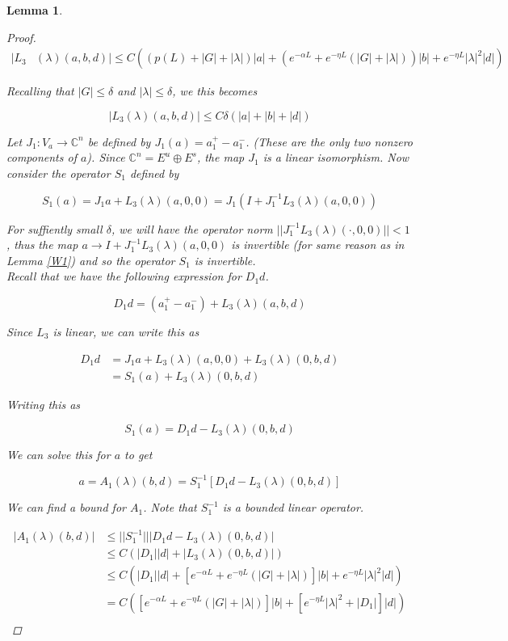 \documentclass[12pt]{article}
\def\C{{\mathbb C}}
\newtheorem{lemma}{Lemma}
\begin{document}
\begin{lemma}
\begin{proof}
\begin{align*}
|L_3&(\lambda)(a,b,d)| \leq C \left( \left( p(L) + |G| + |\lambda|\right) |a| + \left( e^{-\alpha L} + e^{-\eta L} \left(|G| + |\lambda|\right) \right) |b| + e^{-\eta L} |\lambda|^2 |d| \right)
\end{align*}


Recalling that $|G|\leq \delta$ and $|\lambda| \leq \delta$, we this becomes 

\[
|L_3(\lambda)(a,b,d)| \leq C\delta(|a| + |b| + |d|)
\]

Let $J_1: V_a \rightarrow \C^n$ be defined by $J_1(a) = a_1^+ - a_1^-$. (These are the only two nonzero components of $a$). Since $\C^n = E^u \oplus E^s$, the map $J_1$ is a linear isomorphism. Now consider the operator $S_1$ defined by

\[
S_1(a) = J_1 a + L_3(\lambda)(a, 0, 0) = J_1( I + J_1^{-1} L_3(\lambda)(a, 0, 0) )
\]

For suffiently small $\delta$, we will have the operator norm $||J_1^{-1} L_3(\lambda)(\cdot, 0, 0)|| < 1$, thus the map $a \rightarrow I + J_1^{-1} L_3(\lambda)(a, 0, 0)$ is invertible (for same reason as in Lemma \ref{W1}) and so the operator $S_1$ is invertible.\\

Recall that we have the following expression for $D_1 d$.

\[
D_1 d = (a^+_1 - a^-_1) + L_3(\lambda)(a,b,d)
\] 

Since $L_3$ is linear, we can write this as

\begin{align*}
D_1 d &= J_1 a + L_3(\lambda)(a, 0, 0) + L_3(\lambda)(0, b, d) \\
&= S_1(a) + L_3(\lambda)(0, b, d) 
\end{align*}

Writing this as 

\[
S_1(a) = D_1 d - L_3(\lambda)(0, b, d) 
\]

We can solve this for $a$ to get

\begin{equation}
a = A_1(\lambda)(b,d) = S_1^{-1}[D_1 d - L_3(\lambda)(0, b, d)] 
\end{equation}

We can find a bound for $A_1$. Note that $S_1^{-1}$ is a bounded linear operator.

\begin{align*}
|A_1(\lambda)(b,d)| &\leq ||S_1^{-1}|||D_1 d - L_3(\lambda)(0, b, d)| \\
&\leq C (|D_1||d| + |L_3(\lambda)(0, b, d)|) \\
&\leq C (|D_1||d| +  \left[e^{-\alpha L} + e^{-\eta L} \left(|G| + |\lambda| \right) \right]|b| + e^{-\eta L} |\lambda|^2 |d|)\\
&= C\left( \left[e^{-\alpha L} + e^{-\eta L} \left(|G| + |\lambda|\right) \right]|b| + \left[ e^{-\eta L} |\lambda|^2 + |D_1| \right] |d| \right)\\
\end{align*}


\end{proof}
\end{lemma}
\end{document}
